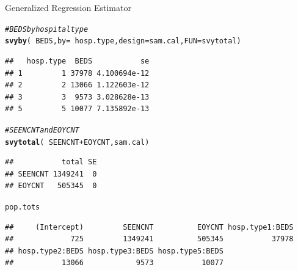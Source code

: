 \documentclass[10pt]{beamer}\usepackage[]{graphicx}\usepackage[]{color}
\makeatletter
\newcommand{\hlstr}[1]{\textcolor[rgb]{0.192,0.494,0.8}{#1}}%
\newcommand{\hlcom}[1]{\textcolor[rgb]{0.678,0.584,0.686}{\textit{#1}}}%
\newcommand{\hlopt}[1]{\textcolor[rgb]{0,0,0}{#1}}%
\newcommand{\hlstd}[1]{\textcolor[rgb]{0.345,0.345,0.345}{#1}}%
\newcommand{\hlkwb}[1]{\textcolor[rgb]{0.69,0.353,0.396}{#1}}%
\newcommand{\hlkwc}[1]{\textcolor[rgb]{0.333,0.667,0.333}{#1}}%
\newcommand{\hlkwd}[1]{\textcolor[rgb]{0.737,0.353,0.396}{\textbf{#1}}}%
\newenvironment{kframe}{%
 \def\at@end@of@kframe{}%
 \ifinner\ifhmode%
  \def\at@end@of@kframe{\end{minipage}}%
  \begin{minipage}{\columnwidth}%
 \fi\fi%
 \def\FrameCommand##1{\hskip\@totalleftmargin \hskip-\fboxsep
 \colorbox{shadecolor}{##1}\hskip-\fboxsep
     \hskip-\linewidth \hskip-\@totalleftmargin \hskip\columnwidth}%
 \MakeFramed {\advance\hsize-\width
   \@totalleftmargin\z@ \linewidth\hsize
   \@setminipage}}%
 {\par\unskip\endMakeFramed%
 \at@end@of@kframe}
\newenvironment{knitrout}{}{} %
\makeatother
\begin{document}
\begin{frame}[fragile]{Generalized Regression Estimator}
\begin{lrbox}{\mysavebox}
\begin{knitrout}\footnotesize
{}\color{fgcolor}\begin{kframe}
\begin{alltt}
\hlcom{#BEDS by hospital type}
\hlkwd{svyby}\hlstd{(}\hlopt{~}\hlstd{BEDS,} \hlkwc{by}\hlstd{=}\hlopt{~}\hlstd{hosp.type,} \hlkwc{design}\hlstd{=sam.cal,} \hlkwc{FUN}\hlstd{=svytotal)}
\end{alltt}
\begin{verbatim}
##   hosp.type  BEDS           se
## 1         1 37978 4.100694e-12
## 2         2 13066 1.122603e-12
## 3         3  9573 3.028628e-13
## 5         5 10077 7.135892e-13
\end{verbatim}
\begin{alltt}
\hlcom{#SEENCNT and EOYCNT}
\hlkwd{svytotal}\hlstd{(}\hlopt{~}\hlstd{SEENCNT}\hlopt{+}\hlstd{EOYCNT, sam.cal)}
\end{alltt}
\begin{verbatim}
##           total SE
## SEENCNT 1349241  0
## EOYCNT   505345  0
\end{verbatim}
\begin{alltt}
\hlstd{pop.tots}
\end{alltt}
\begin{verbatim}
##     (Intercept)         SEENCNT          EOYCNT hosp.type1:BEDS 
##             725         1349241          505345           37978 
## hosp.type2:BEDS hosp.type3:BEDS hosp.type5:BEDS 
##           13066            9573           10077
\end{verbatim}
\end{kframe}
\end{knitrout}
\end{lrbox}

\end{frame}
\end{document}
